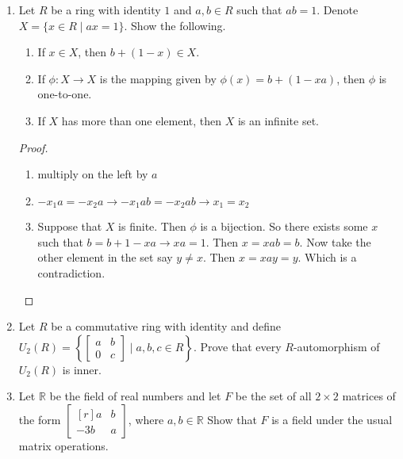 \documentclass{article}
\theoremstyle{definition}
\newcommand{\Z}{\mathbb{Z}}
\newcommand{\R}{\mathbb{R}}
\newcommand{\mat}[1]{\begin{bmatrix*}[r] #1 \end{bmatrix*}}
\newcommand{\x}{\times}
\begin{document}
\begin{enumerate}
            \begin{proof}
                Use $\Z\x R$ or $\Z_n\x R$ to embed $R$ into a ring with unity.
            \end{proof}
            
            \item Let $R$ be a ring with identity $1$ and $a,b\in R$ such that $ab=1$. Denote $X=\{x\in R\mid  ax=1\}$. Show the following.
            
            \begin{enumerate}
                \item If $x\in X$, then $b+(1-x)\in X$.
                \item If $\phi:X\to X$ is the mapping given by $\phi(x)=b+(1-xa)$, then $\phi$ is one-to-one.
                \item If $X$ has more than one element, then $X$ is an infinite set.
            \end{enumerate}

            \begin{proof}
                \begin{enumerate}
                    \item multiply on the left by $a$
                    \item $-x_1a=-x_2a \longrightarrow -x_1ab=-x_2ab \longrightarrow x_1=x_2$
                    \item Suppose that $X$ is finite. Then $\phi$ is a bijection. So there exists some $x$ such that $b=b+1-xa \longrightarrow xa=1$. Then $x=xab=b$. Now take the other element in the set say $y\neq x$. Then $x=xay=y$. Which is a contradiction.
                \end{enumerate}
            \end{proof}

            \item Let $R$ be a commutative ring with identity and define $U_2(R)=\left\{\begin{bmatrix} a&b\\0&c \end{bmatrix} \mid  a,b,c\in R \right\}$. Prove that every $R$-automorphism of $U_2(R)$ is inner.
            
            \item Let $\R$ be the field of real numbers and let $F$ be the set of all $2\times 2$ matrices of the form $\mat{a & b\\-3b&a}$, where $a,b\in \R$ Show that $F$ is a field under the usual matrix operations.
            

\end{enumerate}
\end{document}
